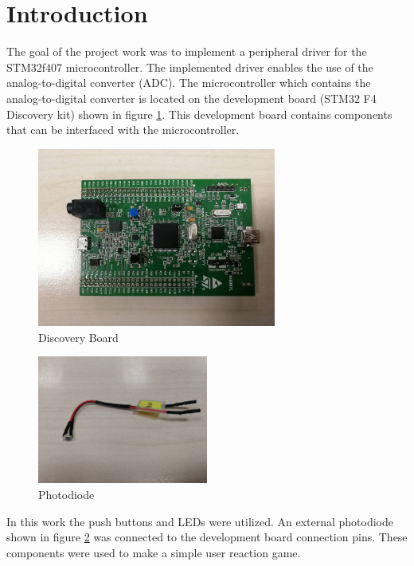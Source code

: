 \section{Introduction}
The goal of the project work was to implement a peripheral driver for the STM32f407 microcontroller. The implemented driver enables the use of the analog-to-digital converter (ADC). The microcontroller which contains the analog-to-digital converter is located on the development board (STM32 F4 Discovery kit) shown in figure \ref{fig:Board}. This development board contains components that can be interfaced with the microcontroller.\\

\begin{figure}[htbp]
  \centering
     \includegraphics[width=0.7\textwidth]{./figures/board.jpg}
  \caption{Discovery Board}
  \label{fig:Board}
\end{figure}

\begin{figure}[htbp]
  \centering
     \includegraphics[width=0.5\textwidth]{./figures/photodiode.jpg}
  \caption{Photodiode}
  \label{fig:photodiode}
\end{figure}

\par
In this work the push buttons and LEDs were utilized. An external photodiode shown in figure \ref{fig:photodiode} was connected to the development board connection pins. These components were used to make a simple user reaction game.

